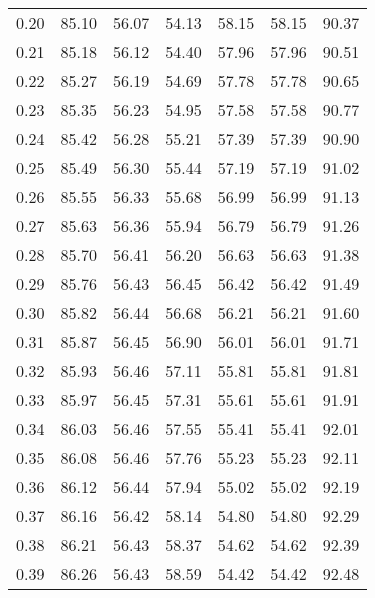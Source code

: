 \begin{tabular}{|c|c|c|c|c|c|c|}
      0.20 &     85.10 &     56.07 &      54.13 &   58.15 &      58.15 &         90.37 \\
      0.21 &     85.18 &     56.12 &      54.40 &   57.96 &      57.96 &         90.51 \\
      0.22 &     85.27 &     56.19 &      54.69 &   57.78 &      57.78 &         90.65 \\
      0.23 &     85.35 &     56.23 &      54.95 &   57.58 &      57.58 &         90.77 \\
      0.24 &     85.42 &     56.28 &      55.21 &   57.39 &      57.39 &         90.90 \\
      0.25 &     85.49 &     56.30 &      55.44 &   57.19 &      57.19 &         91.02 \\
      0.26 &     85.55 &     56.33 &      55.68 &   56.99 &      56.99 &         91.13 \\
      0.27 &     85.63 &     56.36 &      55.94 &   56.79 &      56.79 &         91.26 \\
      0.28 &     85.70 &     56.41 &      56.20 &   56.63 &      56.63 &         91.38 \\
      0.29 &     85.76 &     56.43 &      56.45 &   56.42 &      56.42 &         91.49 \\
      0.30 &     85.82 &     56.44 &      56.68 &   56.21 &      56.21 &         91.60 \\
      0.31 &     85.87 &     56.45 &      56.90 &   56.01 &      56.01 &         91.71 \\
      0.32 &     85.93 &     56.46 &      57.11 &   55.81 &      55.81 &         91.81 \\
      0.33 &     85.97 &     56.45 &      57.31 &   55.61 &      55.61 &         91.91 \\
      0.34 &     86.03 &     56.46 &      57.55 &   55.41 &      55.41 &         92.01 \\
      0.35 &     86.08 &     56.46 &      57.76 &   55.23 &      55.23 &         92.11 \\
      0.36 &     86.12 &     56.44 &      57.94 &   55.02 &      55.02 &         92.19 \\
      0.37 &     86.16 &     56.42 &      58.14 &   54.80 &      54.80 &         92.29 \\
      0.38 &     86.21 &     56.43 &      58.37 &   54.62 &      54.62 &         92.39 \\
      0.39 &     86.26 &     56.43 &      58.59 &   54.42 &      54.42 &         92.48 \\

\end{tabular}

